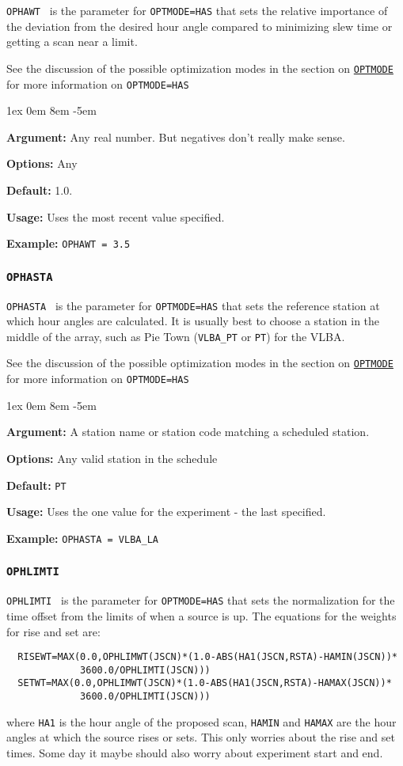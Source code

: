 \documentclass{report}
\newcommand{\rcwbox}[5]{
  \begin{list}{}{\parsep 1ex  \itemsep 0em
                 \leftmargin 8em  \itemindent -5em }
    \item {\bf Argument:} #1
    \item {\bf Options:}  #2
    \item {\bf Default:}  #3
    \item {\bf Usage:}    #4
    \item {\bf Example:}  #5
  \end{list}
}
\begin{document}
{\tt OPHAWT } is the parameter for {\tt OPTMODE=HAS} that sets the
relative importance of the deviation from the desired hour angle
compared to minimizing slew time or getting a scan near a limit.

See the discussion of the possible optimization modes in the section
on 
{\hyperref[MP:OPTMODE]{{\tt OPTMODE}}} for more information on
{\tt OPTMODE=HAS}

\rcwbox
{Any real number.  But negatives don't really make sense.}
{Any}
{1.0.}
{Uses the most recent value specified.}
{{\tt OPHAWT = 3.5}}

\subsubsection{\label{MP:OPHASTA}{\tt OPHASTA}}

{\tt OPHASTA } is the parameter for {\tt OPTMODE=HAS} that sets the
reference station at which hour angles are calculated.  It is usually
best to choose a station in the middle of the array, such as Pie Town
({\tt VLBA\_PT} or {\tt PT}) for the VLBA.

See the discussion of the possible optimization modes in the section
on 
{\hyperref[MP:OPTMODE]{{\tt OPTMODE}}} for more information on
{\tt OPTMODE=HAS}

\rcwbox
{A station name or station code matching a scheduled station.}
{Any valid station in the schedule}
{{\tt PT}}
{Uses the one value for the experiment - the last specified.}
{{\tt OPHASTA = VLBA\_LA}}

\subsubsection{\label{MP:OPHLIMTI}{\tt OPHLIMTI}}

{\tt OPHLIMTI } is the parameter for {\tt OPTMODE=HAS} that sets the
normalization for the time offset from the limits of when a source
is up.   The equations for the weights for rise and set are:
\begin{verbatim}
  RISEWT=MAX(0.0,OPHLIMWT(JSCN)*(1.0-ABS(HA1(JSCN,RSTA)-HAMIN(JSCN))*
             3600.0/OPHLIMTI(JSCN)))
  SETWT=MAX(0.0,OPHLIMWT(JSCN)*(1.0-ABS(HA1(JSCN,RSTA)-HAMAX(JSCN))*
             3600.0/OPHLIMTI(JSCN)))
\end{verbatim}
where {\tt HA1} is the hour angle of the proposed scan, {\tt HAMIN}
and {\tt HAMAX} are the hour angles at which the source rises or
sets.  This only worries about the rise and set times.  Some day
it maybe should also worry about experiment start and end.
\end{document}
